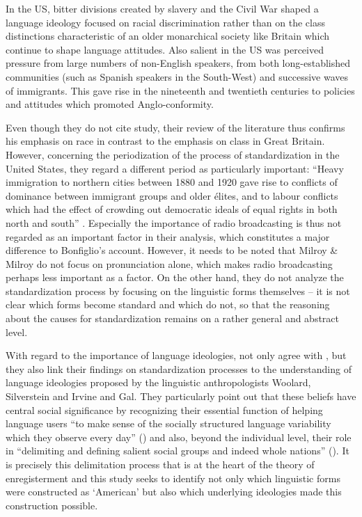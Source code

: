 \begin{modquote}
In the US, bitter divisions created by slavery and the Civil War shaped a language ideology focused on racial discrimination rather than on the class distinctions characteristic of an older monarchical society like Britain which continue to shape language attitudes. Also salient in the US was perceived pressure from large numbers of non-English speakers, from both long-es\-tab\-lished communities (such as Spanish speakers in the South-West) and successive waves of immigrants. This gave rise in the nineteenth and twentieth centuries to policies and attitudes which promoted Anglo-conformity. \citep[160]{Milroy2012}
\end{modquote}


Even though they do not cite  study, their review of the literature thus confirms his emphasis on race in contrast to the emphasis on class in Great Britain. However, concerning the periodization of the process of standardization in the United States, they regard a different period as particularly important: “Heavy immigration to northern cities between 1880 and 1920 gave rise to conflicts of dominance between immigrant groups and older élites, and to labour conflicts which had the effect of crowding out democratic ideals of equal rights in both north and south” \citep[160]{Milroy2012}. Especially the importance of radio broadcasting is thus not regarded as an important factor in their analysis, which constitutes a major difference to Bonfiglio’s account. However, it needs to be noted that Milroy \& Milroy do not focus on pronunciation alone, which makes radio broadcasting perhaps less important as a factor. On the other hand, they do not analyze the standardization process by focusing on the linguistic forms themselves – it is not clear which forms become standard and which do not, so that the reasoning about the causes for standardization remains on a rather general and abstract level.


With regard to the importance of language ideologies, \citet[162]{Milroy2012} not only agree with \citet{Bonfiglio2002}, but they also link their findings on standardization processes to the understanding of language ideologies proposed by the linguistic anthropologists Woolard, Silverstein and Irvine and Gal. They particularly point out that these beliefs have central social significance by recognizing their essential function of helping language users “to make sense of the socially structured language variability which they observe every day” (\citeyear[162]{Milroy2012}) and also, beyond the individual level, their role in “delimiting and defining salient social groups and indeed whole nations” (\citeyear[163]{Milroy2012}). It is precisely this delimitation process that is at the heart of the theory of enregisterment and this study seeks to identify not only which linguistic forms were constructed as ‘American’ but also which underlying ideologies made this construction possible.


